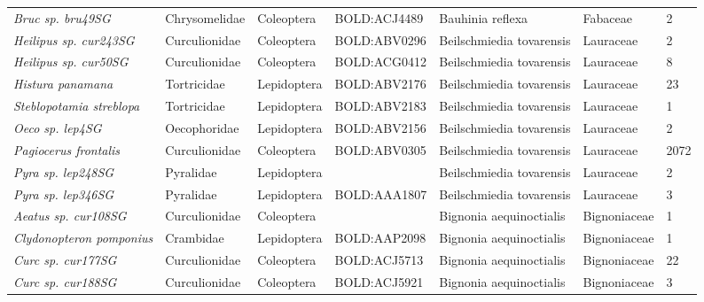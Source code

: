 \documentclass[11pt]{article}
\begin{document}
\begin{landscape}
\begin{longtable}{@{}lllllll@{}}
\textit{Bruc sp. bru49SG}                             & Chrysomelidae   & Coleoptera   & BOLD:ACJ4489 & Bauhinia reflexa                   & Fabaceae         & 2     \\
\textit{Heilipus sp. cur243SG}                        & Curculionidae   & Coleoptera   & BOLD:ABV0296 & Beilschmiedia tovarensis           & Lauraceae        & 2     \\
\textit{Heilipus sp. cur50SG}                         & Curculionidae   & Coleoptera   & BOLD:ACG0412 & Beilschmiedia tovarensis           & Lauraceae        & 8     \\
\textit{Histura panamana}                             & Tortricidae     & Lepidoptera  & BOLD:ABV2176 & Beilschmiedia tovarensis           & Lauraceae        & 23    \\
\textit{Steblopotamia streblopa}                      & Tortricidae     & Lepidoptera  & BOLD:ABV2183 & Beilschmiedia tovarensis           & Lauraceae        & 1     \\
\textit{Oeco sp. lep4SG}                              & Oecophoridae    & Lepidoptera  & BOLD:ABV2156 & Beilschmiedia tovarensis           & Lauraceae        & 2     \\
\textit{Pagiocerus frontalis}                         & Curculionidae   & Coleoptera   & BOLD:ABV0305 & Beilschmiedia tovarensis           & Lauraceae        & 2072  \\
\textit{Pyra sp. lep248SG}                            & Pyralidae       & Lepidoptera  &              & Beilschmiedia tovarensis           & Lauraceae        & 2     \\
\textit{Pyra sp. lep346SG}                            & Pyralidae       & Lepidoptera  & BOLD:AAA1807 & Beilschmiedia tovarensis           & Lauraceae        & 3     \\
\textit{Aeatus sp. cur108SG}                          & Curculionidae   & Coleoptera   &              & Bignonia aequinoctialis            & Bignoniaceae     & 1     \\
\textit{Clydonopteron pomponius}                      & Crambidae       & Lepidoptera  & BOLD:AAP2098 & Bignonia aequinoctialis            & Bignoniaceae     & 1     \\
\textit{Curc sp. cur177SG}                            & Curculionidae   & Coleoptera   & BOLD:ACJ5713 & Bignonia aequinoctialis            & Bignoniaceae     & 22    \\
\textit{Curc sp. cur188SG}                            & Curculionidae   & Coleoptera   & BOLD:ACJ5921 & Bignonia aequinoctialis            & Bignoniaceae     & 3     \\

\end{longtable}
\end{landscape}
\end{document}
